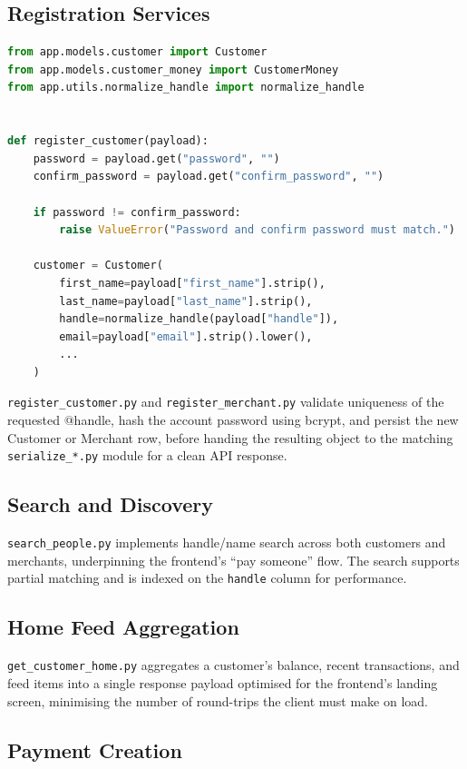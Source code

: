 \documentclass[12pt, a4paper, twoside, openright]{report}
\begin{document}
\subsection{Registration Services}

\begin{lstlisting}[language=Python, caption=Excerpt from register\_customer.py]
from app.models.customer import Customer
from app.models.customer_money import CustomerMoney
from app.utils.normalize_handle import normalize_handle


def register_customer(payload):
    password = payload.get("password", "")
    confirm_password = payload.get("confirm_password", "")

    if password != confirm_password:
        raise ValueError("Password and confirm password must match.")

    customer = Customer(
        first_name=payload["first_name"].strip(),
        last_name=payload["last_name"].strip(),
        handle=normalize_handle(payload["handle"]),
        email=payload["email"].strip().lower(),
        ...
    )
\end{lstlisting}

\texttt{register\_customer.py} and \texttt{register\_merchant.py} validate uniqueness of the requested @handle, hash the account password using bcrypt, and persist the new Customer or Merchant row, before handing the resulting object to the matching \texttt{serialize\_*.py} module for a clean API response.

\subsection{Search and Discovery}

\texttt{search\_people.py} implements handle/name search across both customers and merchants, underpinning the frontend's ``pay someone'' flow. The search supports partial matching and is indexed on the \texttt{handle} column for performance.

\subsection{Home Feed Aggregation}

\texttt{get\_customer\_home.py} aggregates a customer's balance, recent transactions, and feed items into a single response payload optimised for the frontend's landing screen, minimising the number of round-trips the client must make on load.

\subsection{Payment Creation}
\end{document}
